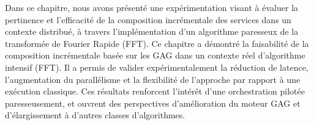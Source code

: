 Dans ce chapitre, nous avons présenté une expérimentation visant à évaluer la pertinence et l’efficacité de la composition incrémentale des services dans un contexte distribué, à travers l’implémentation d’un algorithme paresseux de la transformée de Fourier Rapide (FFT).
Ce chapitre a démontré la faisabilité de la composition incrémentale basée sur les GAG dans un contexte réel d’algorithme intensif (FFT). Il a permis de valider expérimentalement la réduction de latence, l’augmentation du parallélisme et la flexibilité de l’approche par rapport à une exécution classique. Ces résultats renforcent l’intérêt d’une orchestration pilotée paresseusement, et ouvrent des perspectives d’amélioration du moteur GAG et d’élargissement à d’autres classes d’algorithmes.
